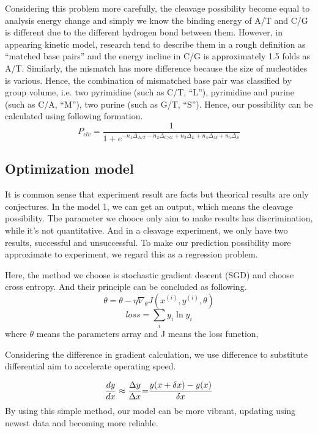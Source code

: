 \documentclass[a4paper,10pt]{article}
\begin{document}
	Considering this problem more carefully, the cleavage possibility become equal to analysis energy change and simply we know the binding energy of A/T and C/G is different due to the different hydrogen bond between them. However, in appearing kinetic model, research tend to describe them in a rough definition as “matched base pairs” and the energy incline in C/G is approximately 1.5 folds as A/T. Similarly, the mismatch has more difference because the size of nucleotides is various. Hence, the combination of mismatched base pair was classified by group volume, i.e. two pyrimidine (such as C/T, “L”), pyrimidine  and purine (such as C/A, “M”), two purine (such as G/T, “S”). Hence, our possibility can be calculated using following formation.
	$$
	P_{clv}=\frac{1}{1+e^{-n_1\Delta_{A/T}-n_2\Delta_{C/G}+n_3\Delta_{L}+n_4\Delta_{M}+n_5\Delta_{S}}}
	$$
	\subsection{Optimization model}
	It is common sense that experiment result are facts but theorical results are only conjectures. In the model 1, we can get an output, which means the cleavage possibility. The parameter we chooce only aim to make results has discrimination, while it’s not quantitative. And in a cleavage experiment, we only have two results, successful and unsuccessful. To make our prediction possibility more approximate to experiment, we regard this as a regression problem.\par
	Here, the method we choose is stochastic gradient descent (SGD) and choose cross entropy. And their principle can be concluded as following.
	\[\theta  = \theta  - \eta {\nabla _\theta }J({x^{(i)}},{y^{(i)}},\theta )\]
	\[loss = \sum\limits_i {{y_i}\ln {y_i}}\]
	where $\theta$ means the parameters array and J means the loss function, \par
	Considering the difference in gradient calculation, we use difference to substitute differential aim to accelerate operating speed.\par
	\[\frac{{dy}}{{dx}} \approx \frac{{\Delta y}}{{\Delta x}}{\rm{ = }}\frac{{y(x + \delta x) - y(x)}}{{\delta x}}\]
	By using this simple method, our model can be more vibrant, updating using newest data and becoming more reliable.
\end{document}
